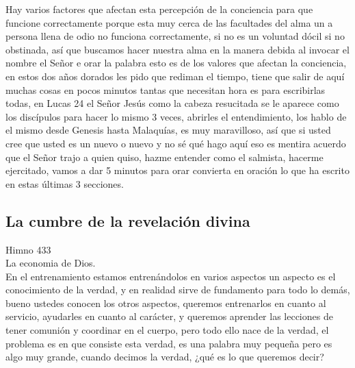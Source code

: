 \documentclass[12pt]{article}
\begin{document}
Hay varios factores que afectan esta percepción de la conciencia para que funcione correctamente porque esta muy cerca de las facultades del alma un a persona llena de odio no funciona correctamente, si no es un voluntad dócil si no obstinada, así que buscamos hacer nuestra alma en la manera debida al invocar el nombre el Señor e orar la palabra esto es de los valores que afectan la conciencia, en estos dos años dorados les pido que rediman el tiempo, tiene que salir de aquí muchas cosas en  pocos minutos tantas que necesitan hora es para escribirlas todas, en Lucas 24 el Señor Jesús como la cabeza resucitada se le aparece como los discípulos para hacer lo mismo 3 veces, abrirles el entendimiento, los hablo de el mismo desde Genesis hasta Malaquías, es muy maravilloso, así que si usted cree que usted es un nuevo o nuevo y no sé qué hago aquí eso es mentira acuerdo que el Señor trajo a quien quiso, hazme entender como el salmista, hacerme  ejercitado, vamos a dar 5 minutos para orar convierta en oración lo  que ha escrito en estas últimas 3 secciones.\\

\subsection*{La cumbre de la revelación divina}

Himno 433\\

La economia de Dios.\\

En el entrenamiento estamos entrenándolos en varios aspectos un aspecto es el conocimiento de la verdad, y en realidad sirve de fundamento para todo lo demás, bueno ustedes conocen los otros aspectos, queremos entrenarlos en cuanto al servicio, ayudarles en cuanto al carácter, y queremos aprender las lecciones de tener comunión y coordinar en el cuerpo, pero todo ello nace de la verdad, el problema es en que consiste esta verdad, es una palabra muy pequeña pero es algo muy grande, cuando decimos la verdad, ¿qué es lo que queremos decir?\\
\end{document}
